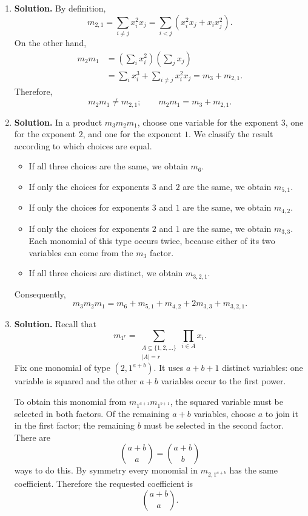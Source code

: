 \documentclass{article}
\begin{document}
\begin{enumerate}
\item \textbf{Solution.}
By definition,
\[
m_{2,1}=\sum_{i\ne j}x_i^2x_j
=\sum_{i<j}\left(x_i^2x_j+x_ix_j^2\right).
\]
On the other hand,
\[
\begin{aligned}
m_2m_1
 &=\left(\sum_i x_i^2\right)\left(\sum_jx_j\right)\\
 &=\sum_i x_i^3+\sum_{i\ne j}x_i^2x_j
 =m_3+m_{2,1}.
\end{aligned}
\]
Therefore,
\[
\boxed{m_2m_1\ne m_{2,1};\qquad
m_2m_1=m_3+m_{2,1}.}
\]

\item \textbf{Solution.}
In a product $m_3m_2m_1$, choose one variable for the exponent $3$, one
for the exponent $2$, and one for the exponent $1$.  We classify the
result according to which choices are equal.
\begin{itemize}
\item If all three choices are the same, we obtain $m_6$.
\item If only the choices for exponents $3$ and $2$ are the same, we
obtain $m_{5,1}$.
\item If only the choices for exponents $3$ and $1$ are the same, we
obtain $m_{4,2}$.
\item If only the choices for exponents $2$ and $1$ are the same, we
obtain $m_{3,3}$.  Each monomial of this type occurs twice, because
either of its two variables can come from the $m_3$ factor.
\item If all three choices are distinct, we obtain $m_{3,2,1}$.
\end{itemize}
Consequently,
\[
\boxed{m_3m_2m_1
=m_6+m_{5,1}+m_{4,2}+2m_{3,3}+m_{3,2,1}.}
\]

\item \textbf{Solution.}
Recall that
\[
m_{1^r}=\sum_{\substack{A\subseteq\{1,2,\ldots\}\\|A|=r}}
\prod_{i\in A}x_i.
\]
Fix one monomial of type $(2,1^{a+b})$.  It uses $a+b+1$ distinct
variables: one variable is squared and the other $a+b$ variables occur
to the first power.

To obtain this monomial from
$m_{1^{a+1}}m_{1^{b+1}}$, the squared variable must be selected in both
factors.  Of the remaining $a+b$ variables, choose $a$ to join it in the
first factor; the remaining $b$ must be selected in the second factor.
There are
\[
\binom{a+b}{a}=\binom{a+b}{b}
\]
ways to do this.  By symmetry every monomial in
$m_{2,1^{a+b}}$ has the same coefficient.  Therefore the requested
coefficient is
\[
\boxed{\binom{a+b}{a}.}
\]


\end{enumerate}
\end{document}
